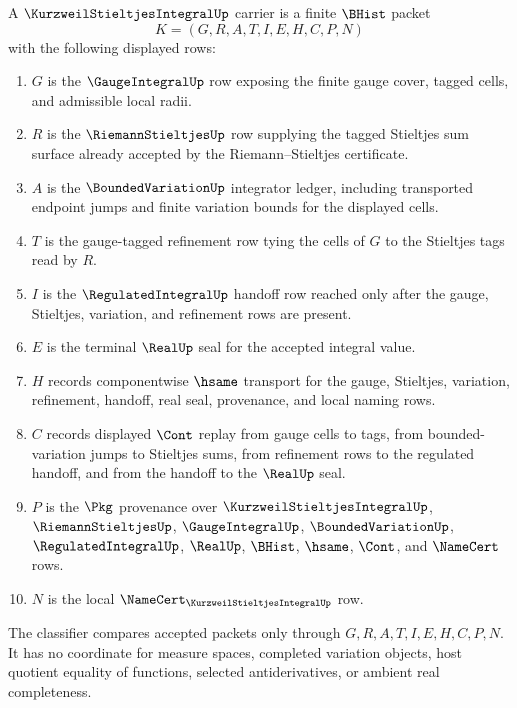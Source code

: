 \begin{definition}
\label{def:kurzweil-stieltjes-integral-carrier}
A $\KurzweilStieltjesIntegralUp$ carrier is a finite $\BHist$ packet
$$
K=(G,R,A,T,I,E,H,C,P,N)
$$
with the following displayed rows:
\begin{enumerate}
\item $G$ is the $\GaugeIntegralUp$ row exposing the finite gauge cover, tagged cells, and admissible local radii.
\item $R$ is the $\RiemannStieltjesUp$ row supplying the tagged Stieltjes sum surface already accepted by the Riemann--Stieltjes certificate.
\item $A$ is the $\BoundedVariationUp$ integrator ledger, including transported endpoint jumps and finite variation bounds for the displayed cells.
\item $T$ is the gauge-tagged refinement row tying the cells of $G$ to the Stieltjes tags read by $R$.
\item $I$ is the $\RegulatedIntegralUp$ handoff row reached only after the gauge, Stieltjes, variation, and refinement rows are present.
\item $E$ is the terminal $\RealUp$ seal for the accepted integral value.
\item $H$ records componentwise $\hsame$ transport for the gauge, Stieltjes, variation, refinement, handoff, real seal, provenance, and local naming rows.
\item $C$ records displayed $\Cont$ replay from gauge cells to tags, from bounded-variation jumps to Stieltjes sums, from refinement rows to the regulated handoff, and from the handoff to the $\RealUp$ seal.
\item $P$ is the $\Pkg$ provenance over $\KurzweilStieltjesIntegralUp$, $\RiemannStieltjesUp$, $\GaugeIntegralUp$, $\BoundedVariationUp$, $\RegulatedIntegralUp$, $\RealUp$, $\BHist$, $\hsame$, $\Cont$, and $\NameCert$ rows.
\item $N$ is the local $\NameCert_{\KurzweilStieltjesIntegralUp}$ row.
\end{enumerate}
The classifier compares accepted packets only through $G,R,A,T,I,E,H,C,P,N$. It has no coordinate for measure spaces, completed variation objects, host quotient equality of functions, selected antiderivatives, or ambient real completeness.
\end{definition}

